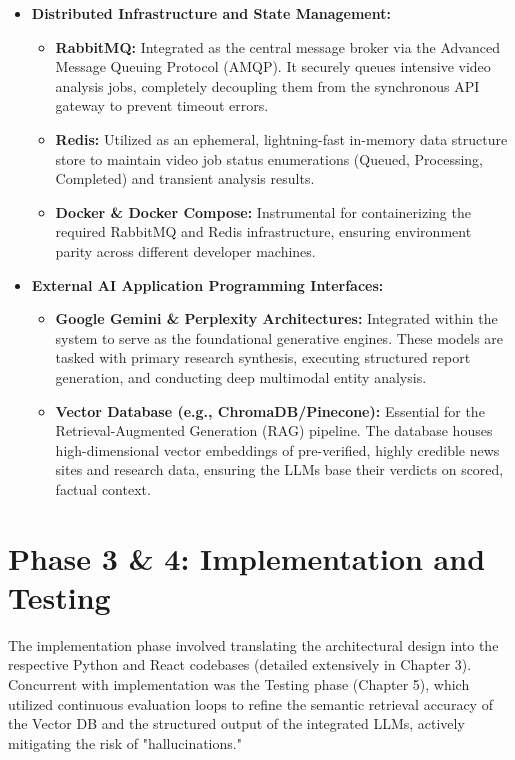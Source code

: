 \begin{itemize}
    \item \textbf{Distributed Infrastructure and State Management:}
    \begin{itemize}
        \item \textbf{RabbitMQ:} Integrated as the central message broker via the Advanced Message Queuing Protocol (AMQP). It securely queues intensive video analysis jobs, completely decoupling them from the synchronous API gateway to prevent timeout errors.
        \item \textbf{Redis:} Utilized as an ephemeral, lightning-fast in-memory data structure store to maintain video job status enumerations (Queued, Processing, Completed) and transient analysis results.
        \item \textbf{Docker & Docker Compose:} Instrumental for containerizing the required RabbitMQ and Redis infrastructure, ensuring environment parity across different developer machines.
    \end{itemize}
    
    \item \textbf{External AI Application Programming Interfaces:}
    \begin{itemize}
        \item \textbf{Google Gemini \& Perplexity Architectures:} Integrated within the system to serve as the foundational generative engines. These models are tasked with primary research synthesis, executing structured report generation, and conducting deep multimodal entity analysis.
        \item \textbf{Vector Database (e.g., ChromaDB/Pinecone):} Essential for the Retrieval-Augmented Generation (RAG) pipeline. The database houses high-dimensional vector embeddings of pre-verified, highly credible news sites and research data, ensuring the LLMs base their verdicts on scored, factual context.
    \end{itemize}
\end{itemize}

\section{Phase 3 \& 4: Implementation and Testing}
The implementation phase involved translating the architectural design into the respective Python and React codebases (detailed extensively in Chapter 3). Concurrent with implementation was the Testing phase (Chapter 5), which utilized continuous evaluation loops to refine the semantic retrieval accuracy of the Vector DB and the structured output of the integrated LLMs, actively mitigating the risk of "hallucinations."
